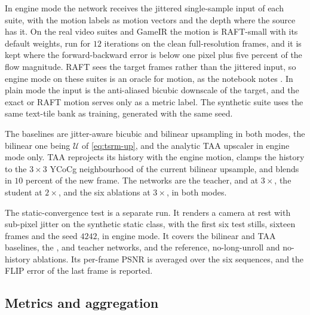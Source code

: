 In engine mode the network receives the jittered single-sample input of each suite, with the motion labels as motion vectors and the depth where the source has it. On the real video suites and GameIR the motion is RAFT-small \cite{teed2020raft} with its default weights, run for $12$ iterations on the clean full-resolution frames, and it is kept where the forward-backward error is below one pixel plus five percent of the flow magnitude. RAFT sees the target frames rather than the jittered input, so engine mode on these suites is an oracle for motion, as the notebook notes \UnderRevision. In plain mode the input is the anti-aliased bicubic downscale of the target, and the exact or RAFT motion serves only as a metric label. The synthetic suite uses the same text-tile bank as training, generated with the same seed.

The baselines are jitter-aware bicubic and bilinear upsampling in both modes, the bilinear one being $\mathcal{U}$ of \cref{eq:tsrm-up}, and the analytic TAA upscaler in engine mode only. TAA reprojects its history with the engine motion, clamps the history to the $3\times3$ YCoCg neighbourhood of the current bilinear upsample, and blends in $10$ percent of the new frame. The networks are the teacher,  and  at $3\times$, the  student at $2\times$, and the six ablations at $3\times$, in both modes.

The static-convergence test is a separate run. It renders a camera at rest with sub-pixel jitter on the synthetic static class, with the first six test stills, sixteen frames and the seed $4242$, in engine mode. It covers the bilinear and TAA baselines, the ,  and teacher networks, and the reference, no-long-unroll and no-history ablations. Its per-frame PSNR is averaged over the six sequences, and the FLIP error \cite{andersson2020flip} of the last frame is reported.

\subsection{Metrics and aggregation}\label{sec:tsrm-metrics}

